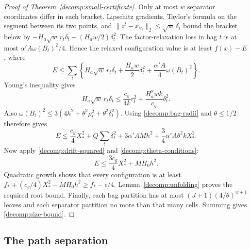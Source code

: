 \begin{proof}[Proof of Theorem~\ref{decomp:small-certificate}]
Only at most $w$ separator coordinates differ in each bracket.
Lipschitz gradients, Taylor's formula on the segment between its two
points, and $\|z^t-x_{V_t}\|_2\le\sqrt w\,\delta_t$ bound the bracket
below by
$-H_a\sqrt w\,r_t\delta_t-(H_aw/2)\delta_t^2$.
The factor-relaxation loss in bag $t$ is at most
$\alpha'A\omega(B_t)^2/4$. Hence the relaxed configuration value is
at least $f(x)-E$, where
\[
 E\le\sum_t\left\{H_a\sqrt w\,r_t\delta_t+
      \frac{H_aw}{2}\delta_t^2+\frac{\alpha'A}{4}\omega(B_t)^2\right\}.
\]
Young's inequality gives
\[
 H_a\sqrt w\,r_t\delta_t
 \le\frac{c_g}{4k}r_t^2+\frac{H_a^2wk}{c_g}\delta_t^2.
\]
Also $\omega(B_t)^2\le3(4h^2+\theta^2\rho_t^2+
\theta^2\delta_t^2)$. Using \eqref{decomp:bag-radii} and $\theta\le1/2$
therefore gives
\[
 E\le\frac{c_g}{4}X_*^2+Q\sum_t\delta_t^2+
      3\alpha'AMh^2+\frac34\alpha'A\theta^2kX_*^2.
\]
Now apply \eqref{decomp:drift-squared} and
\eqref{decomp:theta-conditions}:
\[
 E\le\frac{3c_g}{4}X_*^2+MH_0h^2.
\]
Quadratic growth shows that every configuration is at least
$f_*+(c_g/4)X_*^2-MH_0h^2\ge f_*-\epsilon/4$.
Lemma~\ref{decomp:unfolding} proves the required root bound.
Finally, each bag partition has at most
$(J+1)(4/\theta)^{w+1}$ leaves and each separator partition no more than
that many cells. Summing gives \eqref{decomp:size-bound}.
\end{proof}

\subsection{The path separation}
\label{app:decomp:path}


